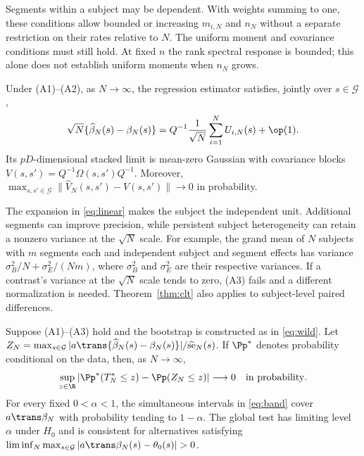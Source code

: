 Segments within a subject may be dependent. With weights summing to one, these conditions allow bounded or increasing $m_{i,N}$ and $n_N$ without a separate restriction on their rates relative to $N$. The uniform moment and covariance conditions must still hold. At fixed $n$ the rank spectral response is bounded; this alone does not establish uniform moments when $n_N$ grows.

\begin{theorem}\label{thm:clt}
Under (A1)--(A2), as $N\to\infty$, the regression estimator satisfies, jointly over $s\in\mathcal G$,
\begin{equation}\label{eq:linear}
 \sqrt N\{\widehat\beta_N(s)-\beta_N(s)\}
 =Q^{-1}\frac1{\sqrt N}\sum_{i=1}^N U_{i,N}(s)+\op(1).
\end{equation}
Its $pD$-dimensional stacked limit is mean-zero Gaussian with covariance blocks $V(s,s')=Q^{-1}\Omega(s,s')Q^{-1}$. Moreover, $\max_{s,s'\in\mathcal G}\|\widehat V_N(s,s')-V(s,s')\|\to0$ in probability.
\end{theorem}

The expansion in \eqref{eq:linear} makes the subject the independent unit. Additional segments can improve precision, while persistent subject heterogeneity can retain a nonzero variance at the $\sqrt N$ scale. For example, the grand mean of $N$ subjects with $m$ segments each and independent subject and segment effects has variance $\sigma_B^2/N+\sigma_E^2/(Nm)$, where $\sigma_B^2$ and $\sigma_E^2$ are their respective variances. If a contrast's variance at the $\sqrt N$ scale tends to zero, (A3) fails and a different normalization is needed. Theorem~\ref{thm:clt} also applies to subject-level paired differences.

\begin{theorem}\label{thm:bootstrap}
Suppose (A1)--(A3) hold and the bootstrap is constructed as in \eqref{eq:wild}. Let
$Z_N=\max_{s\in\mathcal G}|a\trans\{\widehat\beta_N(s)-\beta_N(s)\}|/\widehat{\mathrm{se}}_N(s)$.
If $\Pp^*$ denotes probability conditional on the data, then, as $N\to\infty$,
\begin{equation}\label{eq:bootstrap-valid}
 \sup_{z\in\R}\left|\Pp^*(T_N^*\leq z)-\Pp(Z_N\leq z)\right|
 \longrightarrow 0
 \quad\text{in probability}.
\end{equation}
For every fixed $0<\alpha<1$, the simultaneous intervals in \eqref{eq:band} cover $a\trans\beta_N$ with probability tending to $1-\alpha$. The global test has limiting level $\alpha$ under $H_0$ and is consistent for alternatives satisfying $\liminf_N\max_{s\in\mathcal G}|a\trans\beta_N(s)-\theta_0(s)|>0$.
\end{theorem}

